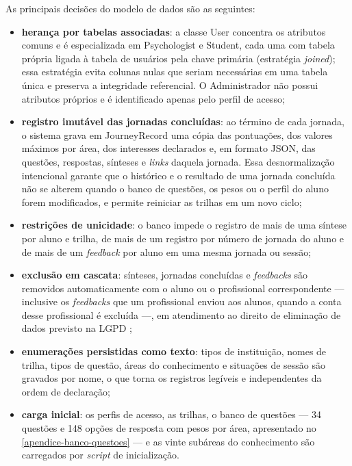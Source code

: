 As principais decisões do modelo de dados são as seguintes:

\begin{itemize}
  \item \textbf{herança por tabelas associadas}: a classe User concentra os atributos comuns e é especializada em Psychologist e Student, cada uma com tabela própria ligada à tabela de usuários pela chave primária (estratégia \textit{joined}); essa estratégia evita colunas nulas que seriam necessárias em uma tabela única e preserva a integridade referencial. O Administrador não possui atributos próprios e é identificado apenas pelo perfil de acesso;
  \item \textbf{registro imutável das jornadas concluídas}: ao término de cada jornada, o sistema grava em JourneyRecord uma cópia das pontuações, dos valores máximos por área, dos interesses declarados e, em formato JSON, das questões, respostas, sínteses e \textit{links} daquela jornada. Essa desnormalização intencional garante que o histórico e o resultado de uma jornada concluída não se alterem quando o banco de questões, os pesos ou o perfil do aluno forem modificados, e permite reiniciar as trilhas em um novo ciclo;
  \item \textbf{restrições de unicidade}: o banco impede o registro de mais de uma síntese por aluno e trilha, de mais de um registro por número de jornada do aluno e de mais de um \textit{feedback} por aluno em uma mesma jornada ou sessão;
  \item \textbf{exclusão em cascata}: sínteses, jornadas concluídas e \textit{feedbacks} são removidos automaticamente com o aluno ou o profissional correspondente --- inclusive os \textit{feedbacks} que um profissional enviou aos alunos, quando a conta desse profissional é excluída ---, em atendimento ao direito de eliminação de dados previsto na LGPD \cite{brasil2018lgpd};
  \item \textbf{enumerações persistidas como texto}: tipos de instituição, nomes de trilha, tipos de questão, áreas do conhecimento e situações de sessão são gravados por nome, o que torna os registros legíveis e independentes da ordem de declaração;
  \item \textbf{carga inicial}: os perfis de acesso, as trilhas, o banco de questões --- 34 questões e 148 opções de resposta com pesos por área, apresentado no \autoref{apendice-banco-questoes} --- e as vinte subáreas do conhecimento são carregados por \textit{script} de inicialização.
\end{itemize}

